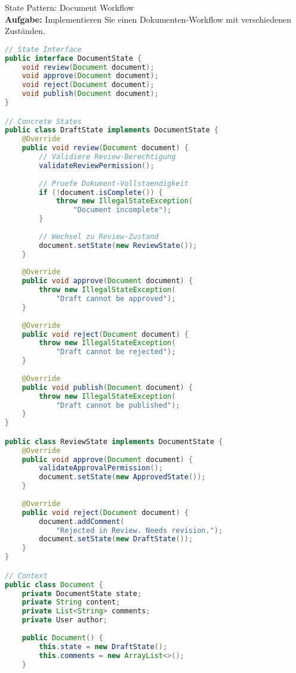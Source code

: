 \begin{example2}[breakable]{State Pattern: Document Workflow}\\
\textbf{Aufgabe:} Implementieren Sie einen Dokumenten-Workflow mit verschiedenen Zuständen.

\begin{lstlisting}[language=Java, style=basesmol]
// State Interface
public interface DocumentState {
    void review(Document document);
    void approve(Document document);
    void reject(Document document);
    void publish(Document document);
}

// Concrete States
public class DraftState implements DocumentState {
    @Override
    public void review(Document document) {
        // Validiere Review-Berechtigung
        validateReviewPermission();
        
        // Pruefe Dokument-Vollstaendigkeit
        if (!document.isComplete()) {
            throw new IllegalStateException(
                "Document incomplete");
        }
        
        // Wechsel zu Review-Zustand
        document.setState(new ReviewState());
    }
    
    @Override
    public void approve(Document document) {
        throw new IllegalStateException(
            "Draft cannot be approved");
    }
    
    @Override
    public void reject(Document document) {
        throw new IllegalStateException(
            "Draft cannot be rejected");
    }
    
    @Override
    public void publish(Document document) {
        throw new IllegalStateException(
            "Draft cannot be published");
    }
}

public class ReviewState implements DocumentState {
    @Override
    public void approve(Document document) {
        validateApprovalPermission();
        document.setState(new ApprovedState());
    }
    
    @Override
    public void reject(Document document) {
        document.addComment(
            "Rejected in Review. Needs revision.");
        document.setState(new DraftState());
    }
}

// Context
public class Document {
    private DocumentState state;
    private String content;
    private List<String> comments;
    private User author;
    
    public Document() {
        this.state = new DraftState();
        this.comments = new ArrayList<>();
    }
    

\end{lstlisting}
\end{example2}
